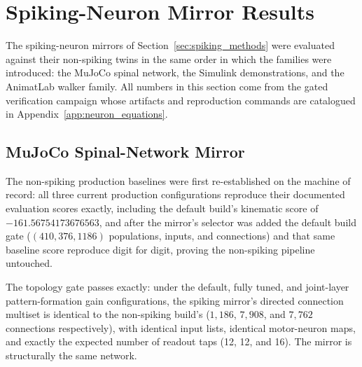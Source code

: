 \section{Spiking-Neuron Mirror Results}\label{sec:spiking_results}

The spiking-neuron mirrors of Section~\ref{sec:spiking_methods} were evaluated against their non-spiking twins in the same order in which the families were introduced: the MuJoCo spinal network, the Simulink demonstrations, and the AnimatLab walker family. All numbers in this section come from the gated verification campaign whose artifacts and reproduction commands are catalogued in Appendix~\ref{app:neuron_equations}.

\subsection{MuJoCo Spinal-Network Mirror}

The non-spiking production baselines were first re-established on the machine of record: all three current production configurations reproduce their documented evaluation scores exactly, including the default build's kinematic score of $-161.56754173676563$, and after the mirror's selector was added the default build gate ($(410, 376, 1186)$ populations, inputs, and connections) and that same baseline score reproduce digit for digit, proving the non-spiking pipeline untouched.

The topology gate passes exactly: under the default, fully tuned, and joint-layer pattern-formation gain configurations, the spiking mirror's directed connection multiset is identical to the non-spiking build's ($1{,}186$, $7{,}908$, and $7{,}762$ connections respectively), with identical input lists, identical motor-neuron maps, and exactly the expected number of readout taps (12, 12, and 16). The mirror is structurally the same network.

